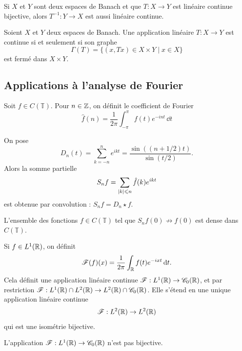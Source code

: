 \documentclass[twocolumn, landscape]{article}
\begin{document}
\begin{theo}
    Si $X$ et $Y$ sont deux espaces de Banach et que $T: X\to Y$ est linéaire continue bijective, alors $T^{-1} : Y \to X$ est aussi linéaire continue.
\end{theo}

\begin{theo}
    Soient $X$ et $Y$ deux espaces de Banach. Une application linéaire $T : X\to Y$ est continue si et seulement si son graphe $$\Gamma(T) = \{ (x, Tx) \in X\times Y \mid x\in X \}$$est fermé dans $X\times Y$.
\end{theo}

\subsection{Applications à l'analyse de Fourier \cite{Rudin}}

\begin{defi}
    Soit $f \in C(\mathbb{T})$. Pour $n  \in \mathbb{Z}$, on définit le coefficient de Fourier $$\hat{f}(n) = \frac{1}{2\pi} \int_{-\pi}^{\pi} f(t) e^{-i n t} \, \dd t$$
\end{defi}

\begin{prop}
    On pose $$D_n(t) = \sum_{k = -n}^n e^{ikt} = \frac{\sin((n+1/2)t)}{\sin(t/2)}.$$
    Alors la somme partielle $$S_n f = \sum_{\left\lvert k \right\rvert \leqslant n} \hat{f}(k) e^{ikt}$$
    est obtenue par convolution : $S_n f = D_n \star f$.
\end{prop}

\begin{appl}
    L'ensemble des fonctions $f \in C(\mathbb{T})$ tel que $S_n f(0) \not\to f(0)$ est dense dans $C(\mathbb{T})$.
\end{appl}

\begin{prop}
    Si $f \in L^1(\mathbb{R})$, on définit $$\mathscr{F}(f)(x) = \frac{1}{2\pi}\int_{\mathbb{R}} f(t) e^{-ixt} \, \mathrm{d} t.$$
    Cela définit une application linéaire continue $\mathscr{F} : L^1(\mathbb{R}) \to \mathscr{C}_0(\mathbb{R})$, et par restriction $\mathscr{F} : L^1(\mathbb{R}) \cap L^2(\mathbb{R}) \to L^2(\mathbb{R}) \cap \mathscr{C}_0(\mathbb{R})$. Elle s'étend en une unique application linéaire continue $$\mathscr{F} : L^2(\mathbb{R}) \to L^2(\mathbb{R})$$
    qui est une isométrie bijective.
\end{prop}

\begin{appl}
    L'application $\mathscr{F} : L^1(\mathbb{R}) \to \mathscr{C}_0(\mathbb{R})$ n'est pas bijective.
\end{appl}
\end{document}
